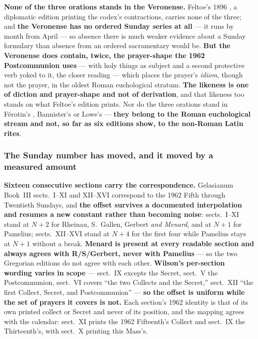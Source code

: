 \textbf{None of the three orations stands in the Veronense.} Feltoe's 1896 ,
a diplomatic edition printing the codex's contractions, carries none of the
three; and \textbf{the
Veronense has no ordered Sunday series at all} --- it runs by month from April
--- so absence there is much weaker evidence about a Sunday formulary than
absence from an ordered sacramentary would be. \textbf{But the Veronense does
contain, twice, the prayer-shape the 1962 Postcommunion uses}
---  with holy things as subject and a second protective verb
yoked to it, the closer reading  --- which places the prayer's
\emph{idiom}, though not the prayer, in the oldest Roman euchological stratum.
\textbf{The likeness is one of diction and prayer-shape and not of derivation},
and that likeness too stands on what Feltoe's
edition prints. Nor do the three orations stand in Férotin's
, Bannister's  or
Lowe's  --- \textbf{they belong to the Roman
euchological stream and not, so far as six editions show, to the non-Roman Latin
rites}.

\subsubsection*{The Sunday number has moved, and it moved by a measured amount}

\textbf{Sixteen consecutive sections carry the correspondence.} Gelasianum Book~III
sects.~I--XI and XII--XVI correspond to the 1962 Fifth through Twentieth
Sundays, and \textbf{the offset survives a documented interpolation and resumes
a new constant rather than becoming noise}: sects.~I--XI stand at $N{+}2$ for
Rheinau, S.~Gallen, Gerbert \emph{and Menard}, and at $N{+}1$ for Pamelius;
sects.~XII--XVI stand at $N{+}4$ for the first four while Pamelius stays at
$N{+}1$ without a break. \textbf{Menard is present at every readable section
and always agrees with R/S/Gerbert, never with Pamelius} --- so the two
Gregorian editions do not agree with each other. \textbf{Wilson's per-section wording
varies in scope} --- sect.~IX excepts the Secret, sect.~V
the Postcommunion, sect.~VI covers ``the two Collects and the Secret,'' sect.~XII
``the first Collect, Secret, and Postcommunion'' --- \textbf{so the offset is
uniform while the set of prayers it covers is not.} Each section's 1962 identity is that of its own printed collect or
Secret and never of its position, and the mapping agrees with the
calendar: sect.~XI prints the 1962 Fifteenth's Collect and sect.~IX the
Thirteenth's, with sect.~X printing this Mass's.


